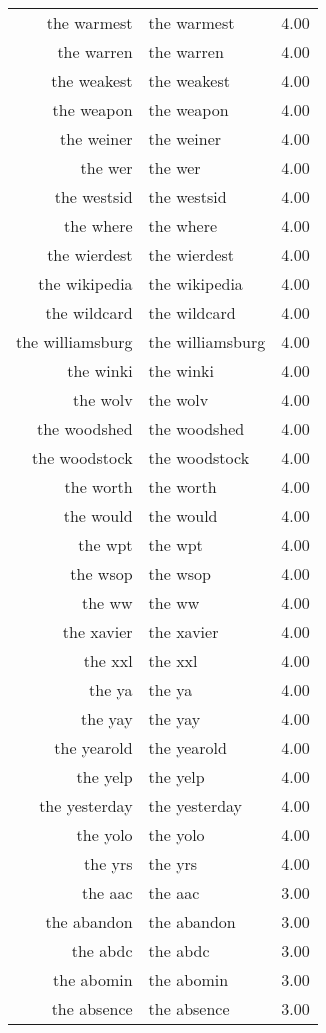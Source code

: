 \begin{table}[ht]
\begin{tabular}{rlr}
  the warmest & the warmest & 4.00 \\ 
  the warren & the warren & 4.00 \\ 
  the weakest & the weakest & 4.00 \\ 
  the weapon & the weapon & 4.00 \\ 
  the weiner & the weiner & 4.00 \\ 
  the wer & the wer & 4.00 \\ 
  the westsid & the westsid & 4.00 \\ 
  the where & the where & 4.00 \\ 
  the wierdest & the wierdest & 4.00 \\ 
  the wikipedia & the wikipedia & 4.00 \\ 
  the wildcard & the wildcard & 4.00 \\ 
  the williamsburg & the williamsburg & 4.00 \\ 
  the winki & the winki & 4.00 \\ 
  the wolv & the wolv & 4.00 \\ 
  the woodshed & the woodshed & 4.00 \\ 
  the woodstock & the woodstock & 4.00 \\ 
  the worth & the worth & 4.00 \\ 
  the would & the would & 4.00 \\ 
  the wpt & the wpt & 4.00 \\ 
  the wsop & the wsop & 4.00 \\ 
  the ww & the ww & 4.00 \\ 
  the xavier & the xavier & 4.00 \\ 
  the xxl & the xxl & 4.00 \\ 
  the ya & the ya & 4.00 \\ 
  the yay & the yay & 4.00 \\ 
  the yearold & the yearold & 4.00 \\ 
  the yelp & the yelp & 4.00 \\ 
  the yesterday & the yesterday & 4.00 \\ 
  the yolo & the yolo & 4.00 \\ 
  the yrs & the yrs & 4.00 \\ 
  the aac & the aac & 3.00 \\ 
  the abandon & the abandon & 3.00 \\ 
  the abdc & the abdc & 3.00 \\ 
  the abomin & the abomin & 3.00 \\ 
  the absence & the absence & 3.00 \\ 

\end{tabular}
\end{table}

